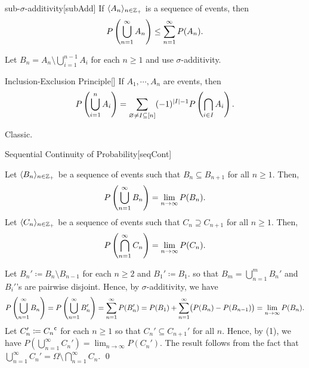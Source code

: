 \documentclass[../complex_variables_1.tex]{subfiles}
\begin{document}
\begin{Lemma}{sub-\(\sigma\)-additivity}[subAdd]
    If \(\lang A_n \rang_{n \in \ZZ_+}\) is a sequence of events, then
    \[
        P\left( \bigcup_{n=1}^\infty A_n \right) \le \sum_{n=1}^\infty P(A_n)\text.
    \]
\end{Lemma}
\begin{myproof}[Proof]
    Let \(B_n = A_n \setminus \bigcup_{i=1}^{n-1} A_i\)
    for each \(n \ge 1\) and use \(\sigma\)-additivity.
\end{myproof}

\begin{Lemma}{Inclusion-Exclusion Principle}[]
    If \(A_1, \cdots, A_n\) are events, then
    \[
        P \left( \bigcup_{i=1}^n A_i \right)
        = \sum_{\varnothing \neq I \subseteq [n]} (-1)^{|I| - 1} P \left( \bigcap_{i \in I} A_i
        \right)\text.
    \]
\end{Lemma}
\begin{myproof}[Proof]
    Classic.
\end{myproof}

\begin{Theorem}{Sequential Continuity of Probability}[seqCont]
    \begin{enumerate}[label=(\arabic*), ref=\protect{\Cref{th:seqCont} (\arabic*)}]
        \ii\label{itm:seqCont.1}
        Let \(\lang B_n \rang_{n \in \ZZ_+}\) be a sequence of events such that
        \(B_n \subseteq B_{n+1}\) for all \(n \ge 1\). Then,
        \[
            P\left( \bigcup_{n=1}^\infty B_n \right) = \lim_{n \to \infty} P(B_n)\text.
        \]
        \ii\label{itm:seqCont.2}
        Let \(\lang C_n \rang_{n \in \ZZ_+}\) be a sequence of events such that
        \(C_n \supseteq C_{n+1}\) for all \(n \ge 1\). Then,
        \[
            P\left( \bigcap_{n=1}^\infty C_n \right) = \lim_{n \to \infty} P(C_n)\text.
        \]
    \end{enumerate}
\end{Theorem}
\begin{myclaim}[Proof]\hfill
\begin{enumerate}[label=(\arabic*)]
    \ii
    Let \(B_n' \coloneqq B_n \setminus B_{n-1}\) for each \(n \ge 2\) and \(B_1' \coloneqq B_1\).
    so that \(B_m = \bigcup_{n=1}^m B_n'\)
    and \(B_i'\)'s are pairwise disjoint.
    Hence, by \(\sigma\)-additivity, we have
    \[
        P\left( \bigcup_{n=1}^\infty B_n \right) =
        P\left( \bigcup_{n=1}^\infty B_n' \right) =
        \sum_{n=1}^\infty P(B_n') =
        P(B_1) + \sum_{n=1}^\infty \bigl( P(B_n) - P(B_{n-1}) \bigr) =
        \lim_{n \to \infty} P(B_n)\text.
    \]
    \ii
    Let \(C_n' \coloneqq {C_n}^{\mathsf{c}}\) for each \(n \ge 1\)
    so that \(C_n' \subseteq C_{n+1}'\) for all \(n\).
    Hence, by (1), we have \(P\left( \bigcup_{n=1}^\infty C_n' \right) = \lim_{n \to \infty}
    P(C_n')\). The result follows from the fact that
    \(\bigcup_{n=1}^\infty C_n' = \Omega \setminus \bigcap_{n=1}^\infty C_n\).
    \qed
\end{enumerate}
\end{myclaim}
\end{document}
